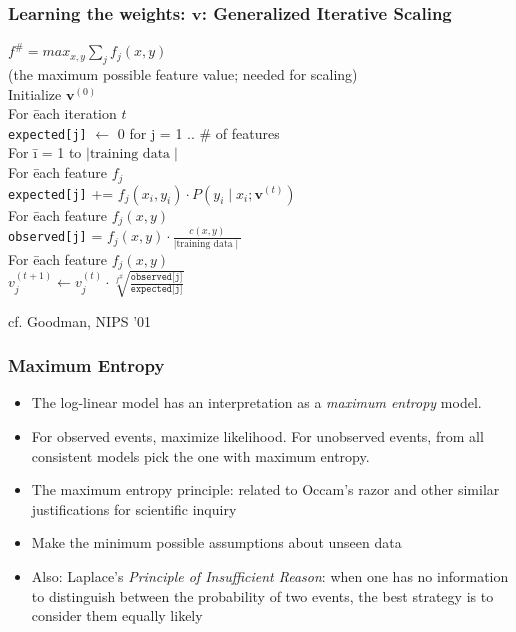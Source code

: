 \begin{frame}
\frametitle{Learning the weights: $\textbf{v}$: Generalized Iterative
  Scaling}
\begin{tabbing}
$f^\# = max_{x,y} \sum_{j} f_j(x, y)$ \\
(the maximum possible feature value; needed for scaling) \pause \\
Initialize $\textbf{v}^{(0)}$ \pause \\
For \= each iteration $t$ \\
\> \texttt{expected[j]} $\leftarrow$ 0 for j = 1 .. \# of features \pause \\
\> For \= i = 1 to $\mid \textrm{training data} \mid$ \\
\>     \> For \= each feature $f_j$ \\
\>     \>     \> \texttt{expected[j]} += $f_j(x_i, y_i) \cdot P(y_i \mid x_i; \textbf{v}^{(t)})$ \pause \\
\> For \= each feature $f_j(x,y)$ \\
\>     \> \texttt{observed[j]} = $f_j(x, y) \cdot \frac{c(x,y)}{\mid \textrm{training data} \mid}$ \pause \\ 
\> For \= each feature $f_j(x,y)$ \\
\>     \> $v_j^{(t+1)} \leftarrow v_j^{(t)} \cdot \sqrt[f^\#]{\frac{\texttt{observed[j]}}{\texttt{expected[j]}}}$ 
\end{tabbing}
\par\noindent
\small{cf. Goodman, NIPS '01}
\end{frame} 





\begin{frame}
\frametitle{Maximum Entropy}
\begin{itemize}[<+->]
\item The log-linear model has an interpretation as a {\it maximum entropy} model.
\item For observed events, maximize likelihood. For unobserved events, from all
consistent models pick the one with maximum entropy.
\item The maximum entropy principle: related to Occam's razor and
  other similar justifications for scientific inquiry
\item Make the minimum possible assumptions about unseen data
\item Also: Laplace's {\em Principle of Insufficient Reason}: when one
  has no information to distinguish between the probability of two
  events, the best strategy is to consider them equally likely
\end{itemize}
\end{frame}

